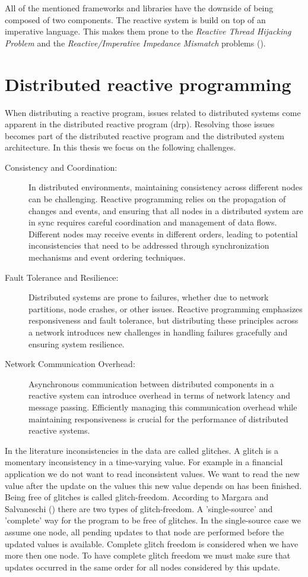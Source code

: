 \documentclass[a4paper]{book}
\begin{document}
All of the mentioned frameworks and libraries have the downside of being composed of two components. The reactive system is build on top of an imperative language. This makes them prone to the \textit{Reactive Thread Hijacking Problem} and the \textit{Reactive/Imperative Impedance Mismatch} problems (\cite{vonder_tackling_2020}).

\section{Distributed reactive programming}

When distributing a reactive program, issues related to distributed systems come apparent in the distributed reactive program (drp). Resolving those issues becomes part of the distributed reactive program and the distributed system architecture. In this thesis we focus on the following challenges.
\begin{description}
	\item[Consistency and Coordination:] In distributed environments, maintaining consistency across different nodes can be challenging. Reactive programming relies on the propagation of changes and events, and ensuring that all nodes in a distributed system are in sync requires careful coordination and management of data flows. Different nodes may receive events in different orders, leading to potential inconsistencies that need to be addressed through synchronization mechanisms and event ordering techniques. 
	\item[Fault Tolerance and Resilience:] Distributed systems are prone to failures, whether due to network partitions, node crashes, or other issues. Reactive programming emphasizes responsiveness and fault tolerance, but distributing these principles across a network introduces new challenges in handling failures gracefully and ensuring system resilience.
	\item[Network Communication Overhead:] Asynchronous communication between distributed components in a reactive system can introduce overhead in terms of network latency and message passing. Efficiently managing this communication overhead while maintaining responsiveness is crucial for the performance of distributed reactive systems.
	
\end{description}

In the literature inconsistencies in the data are called glitches. A glitch is a momentary inconsistency in a time-varying value. For example in a financial application we do not want to read inconsistent values. We want to read the new value after the update on the values this new value depends on has been finished. Being free of glitches is called glitch-freedom. According to Margara and Salvaneschi (\cite{DBLP:journals/tse/MargaraS18}) there are two types of glitch-freedom. A 'single-source' and 'complete' way for the program to be free of glitches. In the single-source case we assume one node, all pending updates to that node are performed before the updated values is available. Complete glitch freedom is considered when we have more then one node. To have complete glitch freedom we must make sure that updates occurred in the same order for all nodes considered by this update. 
\end{document}
